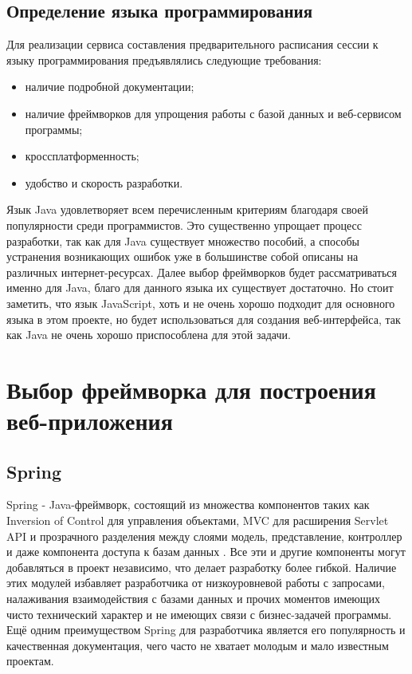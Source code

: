 \subsection{Определение языка программирования}
Для реализации сервиса составления предварительного расписания сессии к языку программирования предъявлялись следующие требования:
\begin{itemize}
	\item наличие подробной документации;
	\item наличие фреймворков для упрощения работы с базой данных и веб-сервисом программы;
	\item кроссплатформенность;
	\item удобство и скорость разработки.
\end{itemize}


Язык Java удовлетворяет всем перечисленным критериям благодаря своей популярности среди программистов. Это существенно упрощает процесс разработки, так как для Java существует множество пособий, а способы устранения возникающих ошибок уже в большинстве собой описаны на различных интернет-ресурсах. Далее выбор фреймворков будет рассматриваться именно для Java, благо для данного языка их существует достаточно. Но стоит заметить, что язык JavaScript, хоть и не очень хорошо подходит для основного языка в этом проекте, но будет использоваться для создания веб-интерфейса, так как Java не очень хорошо приспособлена для этой задачи.

\section{Выбор фреймворка для построения веб-приложения} \label{ch3:sec2}
\subsection{Spring}
Spring - Java-фреймворк, состоящий из множества компонентов таких как Inversion of Control для управления объектами, MVC для расширения Servlet API и прозрачного разделения между слоями модель, представление, контроллер и даже компонента доступа к базам данных \cite{spring}. Все эти и другие компоненты могут добавляться в проект независимо, что делает разработку более гибкой. Наличие этих модулей избавляет разработчика от низкоуровневой работы с запросами, налаживания взаимодействия с базами данных и прочих моментов имеющих чисто технический характер и не имеющих связи с бизнес-задачей программы. Ещё одним преимуществом Spring  для разработчика является его популярность и качественная документация, чего часто не хватает молодым и мало известным проектам.

